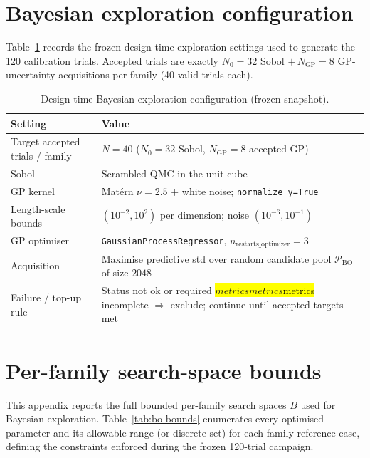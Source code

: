 \documentclass[a4paper,fleqn]{cas-dc}
\let\texthl\hl
\renewcommand{\hl}[1]{\ifmmode\colorbox{yellow}{\ensuremath{#1}}\else\texthl{#1}\fi}
\begin{document}
\section{Bayesian exploration configuration}\label{app:bo-config}

Table~\ref{tab:bo-config} records the frozen design-time exploration settings
used to generate the 120 calibration trials. Accepted trials are exactly
$N_0{=}32$ Sobol $+\,N_{\mathrm{GP}}{=}8$ GP-uncertainty acquisitions per family
(40 valid trials each).

\begin{table}[t]
\caption{Design-time Bayesian exploration configuration (frozen snapshot).}\label{tab:bo-config}
\begin{tabular*}{\textwidth}{@{\extracolsep{\fill}} l l @{}}
\toprule
Setting & Value \\
\midrule
Target accepted trials / family & $N{=}40$ ($N_0{=}32$ Sobol, $N_{\mathrm{GP}}{=}8$ accepted GP) \\
Sobol & Scrambled QMC in the unit cube \\
GP kernel & Mat\'{e}rn $\nu{=}2.5$ $+$ white noise; \texttt{normalize\_y=True} \\
Length-scale bounds & $(10^{-2},10^{2})$ per dimension; noise $(10^{-6},10^{-1})$ \\
GP optimiser & \texttt{GaussianProcessRegressor}, $n_{\mathrm{restarts\_optimizer}}{=}3$ \\
Acquisition & Maximise predictive std over random candidate pool $\mathcal{P}_{\mathrm{BO}}$ of size $2048$ \\
Failure / top-up rule & Status not ok or required \hl{metrics} incomplete $\Rightarrow$ exclude; continue until accepted targets met \\
\bottomrule
\end{tabular*}
\end{table}

\section{Per-family search-space bounds}\label{app:search-bounds}

This appendix reports the full bounded per-family search spaces $B$ used for Bayesian exploration. Table~\ref{tab:bo-bounds} enumerates every optimised parameter and its allowable range (or discrete set) for each family reference case, defining the constraints enforced during the frozen 120-trial campaign.
\end{document}

